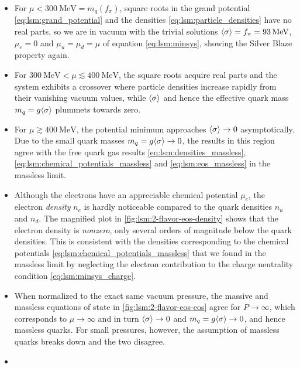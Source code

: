 \begin{itemize}
\item For $\mu < \SI{300}{\mega\electronvolt} = m_q(f_\pi)$, square roots in the grand potential \eqref{eq:lsm:grand_potential} and the densities \eqref{eq:lsm:particle_densities} have no real parts, so we are in vacuum with the trivial solutions $\langle \sigma \rangle = f_\pi = \SI{93}{\mega\electronvolt}$, $\mu_e = 0$ and $\mu_u = \mu_d = \mu$ of equation \eqref{eq:lsm:minsys}, showing the Silver Blaze property again.
\item For $\SI{300}{\mega\electronvolt} < \mu \lesssim \SI{400}{\mega\electronvolt}$, the square roots acquire real parts and the system exhibits a crossover where particle densities increase rapidly from their vanishing vacuum values, while $\langle \sigma \rangle$ and hence the effective quark mass $m_q = g \langle \sigma \rangle$ plummets towards zero.
\item For $\mu \gtrsim \SI{400}{\mega\electronvolt}$, the potential minimum approaches $\langle \sigma \rangle \rightarrow 0$ asymptotically.
      Due to the small quark masses $m_q = g \langle \sigma \rangle \rightarrow 0$, the results in this region agree with the free quark gas results \eqref{eq:lsm:densities_massless}, \eqref{eq:lsm:chemical_potentials_massless} and \eqref{eq:lsm:eos_massless} in the massless limit.
\item Although the electrons have an appreciable chemical potential $\mu_e$, the electron \emph{density} $n_e$ is hardly noticeable compared to the quark densities $n_u$ and $n_d$.
      The magnified plot in \cref{fig:lsm:2-flavor-eos-density} shows that the electron density is \emph{nonzero}, only several orders of magnitude below the quark densities.
      This is consistent with the densities corresponding to the chemical potentials \eqref{eq:lsm:chemical_potentials_massless} that we found in the massless limit by neglecting the electron contribution to the charge neutrality condition \eqref{eq:lsm:minsys_charge}.
\item When normalized to the exact same vacuum pressure, the massive and massless equations of state in \cref{fig:lsm:2-flavor-eos-eos} agree for $P \rightarrow \infty$, which corresponds to $\mu \rightarrow \infty$ and in turn $\langle \sigma \rangle \rightarrow 0$ and $m_q = g \langle \sigma \rangle \rightarrow 0$, and hence massless quarks.
      For small pressures, however, the assumption of massless quarks breaks down and the two disagree.
\item {}
\end{itemize}

